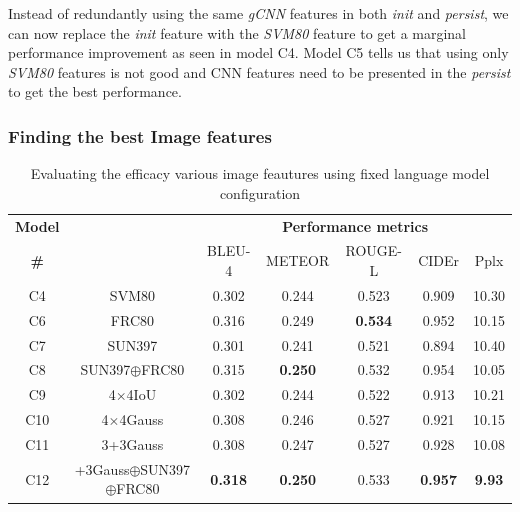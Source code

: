 Instead of redundantly using the same \emph{gCNN} features in both \emph{init} and
\emph{persist}, we can now replace the \emph{init} feature with the \emph{SVM80}
feature to get a marginal performance improvement as seen in model C4.
Model C5 tells us that using only \emph{SVM80} features is not good and CNN
features need to be presented in the \emph{persist} to get the best performance. 

\subsubsection{Finding the best Image features}
\begin{table}[htp]
  \centering
  \newcommand{\bs}{\small}
  \begin{adjustbox}{center}
  \begin{tabular}{|c|c|c|c|c|c|c|}
    \hline
    \bf Model & \bf \multirow{2}{*}{Init feature} & \multicolumn{5}{c|}{\bf Performance metrics}\\
    \cline{3-7}
    \bf \# &\bf &\bs BLEU-4 &\bs METEOR &\bs ROUGE-L &\bs CIDEr&\bs Pplx \\\hline
    C4 & SVM80               & 0.302 & 0.244 & 0.523 & 0.909 & 10.30  \\
    C6 & FRC80               & 0.316 & 0.249 &\bf0.534 & 0.952 & 10.15  \\
    C7 & SUN397              & 0.301 & 0.241 & 0.521 & 0.894 & 10.40  \\
    C8 & SUN397$\oplus$FRC80 & 0.315 &\bf0.250 & 0.532 &0.954 &10.05  \\\hline
    C9 & 4$\times$4IoU       & 0.302 & 0.244 & 0.522 & 0.913 & 10.21  \\
    C10 & 4$\times$4Gauss    & 0.308 & 0.246 & 0.527 & 0.921 & 10.15  \\
    C11 & 3+3Gauss           & 0.308 & 0.247 & 0.527 & 0.928 & 10.08  \\\hline
    C12 &\parbox[c][][c]{4cm}{\smallskip{}+3Gauss$\oplus$SUN397\\$\oplus$FRC80\smallskip} 
                             &\bf0.318&\bf0.250&0.533 &\bf0.957&\bf9.93\\\hline
  \end{tabular}
  \end{adjustbox}
  \caption{ Evaluating the efficacy various image feautures using fixed language model
          configuration}
  \label{tab:resCocFeatExpt}
\end{table}

